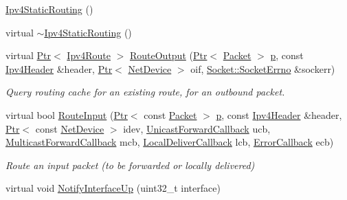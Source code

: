 \begin{DoxyCompactItemize}
\item 
\hyperlink{classns3_1_1Ipv4StaticRouting_ae472733cd2a237a8afa7ce343c116131}{Ipv4\+Static\+Routing} ()
\item 
virtual \hyperlink{classns3_1_1Ipv4StaticRouting_a010d8d8b79d4e66f6e5ab30a169e4097}{$\sim$\+Ipv4\+Static\+Routing} ()
\item 
virtual \hyperlink{classns3_1_1Ptr}{Ptr}$<$ \hyperlink{classns3_1_1Ipv4Route}{Ipv4\+Route} $>$ \hyperlink{classns3_1_1Ipv4StaticRouting_a7a8f0d57d249629f1b7d67e6701571e0}{Route\+Output} (\hyperlink{classns3_1_1Ptr}{Ptr}$<$ \hyperlink{classns3_1_1Packet}{Packet} $>$ \hyperlink{lte__link__budget__x2__handover__measures_8m_ac9de518908a968428863f829398a4e62}{p}, const \hyperlink{classns3_1_1Ipv4Header}{Ipv4\+Header} \&header, \hyperlink{classns3_1_1Ptr}{Ptr}$<$ \hyperlink{classns3_1_1NetDevice}{Net\+Device} $>$ oif, \hyperlink{classns3_1_1Socket_ada1328c5ae0c28cb2a982caf8f6d6cca}{Socket\+::\+Socket\+Errno} \&sockerr)
\begin{DoxyCompactList}\small\item\em Query routing cache for an existing route, for an outbound packet. \end{DoxyCompactList}\item 
virtual bool \hyperlink{classns3_1_1Ipv4StaticRouting_a5e01a8326cd334ad887953345632d7c1}{Route\+Input} (\hyperlink{classns3_1_1Ptr}{Ptr}$<$ const \hyperlink{classns3_1_1Packet}{Packet} $>$ \hyperlink{lte__link__budget__x2__handover__measures_8m_ac9de518908a968428863f829398a4e62}{p}, const \hyperlink{classns3_1_1Ipv4Header}{Ipv4\+Header} \&header, \hyperlink{classns3_1_1Ptr}{Ptr}$<$ const \hyperlink{classns3_1_1NetDevice}{Net\+Device} $>$ idev, \hyperlink{classns3_1_1Ipv4RoutingProtocol_a3453a85764cbbb1e704da7e919aa5d19}{Unicast\+Forward\+Callback} ucb, \hyperlink{classns3_1_1Ipv4RoutingProtocol_a26e76f7a555462e6c08fceda64a99d58}{Multicast\+Forward\+Callback} mcb, \hyperlink{classns3_1_1Ipv4RoutingProtocol_aa6ffa0159cb143daa3c46d2ba69bb1b9}{Local\+Deliver\+Callback} lcb, \hyperlink{classns3_1_1Ipv4RoutingProtocol_a0348285418c30d5021b08f7a68af21ea}{Error\+Callback} ecb)
\begin{DoxyCompactList}\small\item\em Route an input packet (to be forwarded or locally delivered) \end{DoxyCompactList}\item 
virtual void \hyperlink{classns3_1_1Ipv4StaticRouting_a2c84913a130adb6dbd2814da95e789fb}{Notify\+Interface\+Up} (uint32\+\_\+t interface)

\end{DoxyCompactItemize}

